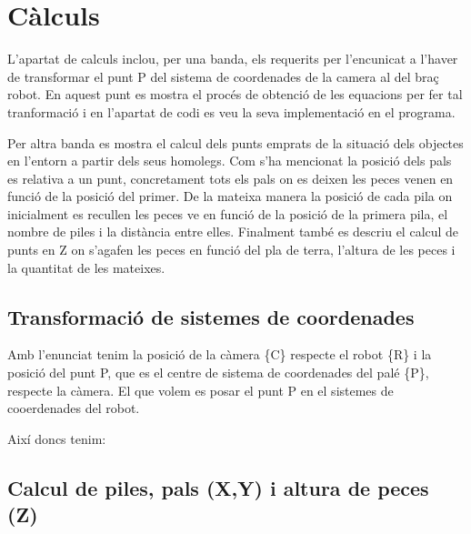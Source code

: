 \section{Càlculs}
L'apartat de calculs inclou, per una banda, els requerits per l'encunicat a l'haver de transformar
el punt P del sistema de coordenades de la camera al del braç robot. En aquest punt es mostra
el procés de obtenció de les equacions per fer tal tranformació i en l'apartat de codi
es veu la seva implementació en el programa.

Per altra banda es mostra el calcul dels punts emprats de la situació dels objectes en l'entorn
a partir dels seus homolegs. Com s'ha mencionat la posició dels pals es relativa a un punt,
concretament tots els pals on es deixen les peces venen en funció de la posició del primer.
De la mateixa manera la posició de cada pila on inicialment es recullen les peces
ve en funció de la posició de la primera pila, el nombre de piles i la distància entre elles.
Finalment també es descriu el calcul de punts en Z on s'agafen les peces en funció del pla
de terra, l'altura de les peces i la quantitat de les mateixes.

\subsection{Transformació de sistemes de coordenades}
Amb l'enunciat tenim la posició de la càmera \{C\} respecte el robot \{R\} i
la posició del punt P, que es el centre de sistema de coordenades del palé \{P\},
respecte la càmera. El que volem es posar el punt P en el sistemes de cooerdenades del robot.

Així doncs tenim:




\subsection{Calcul de piles, pals (X,Y) i altura de peces (Z)}